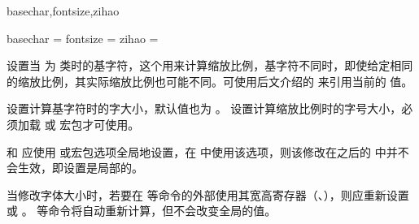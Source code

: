\documentclass{ctxdoc}
\begin{document}
\begin{function}{basechar,fontsize,zihao}
  \begin{syntax}
    basechar =  
    fontsize =  \init{\normalsize}
    zihao = 
  \end{syntax}
   设置当  为  类时的基字符，这个用来计算缩放比例，基字符不同时，即使给定相同的缩放比例，其实际缩放比例也可能不同。可使用后文介绍的  来引用当前的  值。

   设置计算基字符时的字大小，默认值也为 。 设置计算缩放比例时的字号大小，必须加载  或  宏包才可使用。

   和  应使用  或宏包选项全局地设置，在  中使用该选项，则该修改在之后的  中并不会生效，即设置是局部的。

  当修改字体大小时，若要在  等命令的外部使用其宽高寄存器（、），则应重新设置  或 。 等命令将自动重新计算，但不会改变全局的值。
\end{function}
\end{document}
